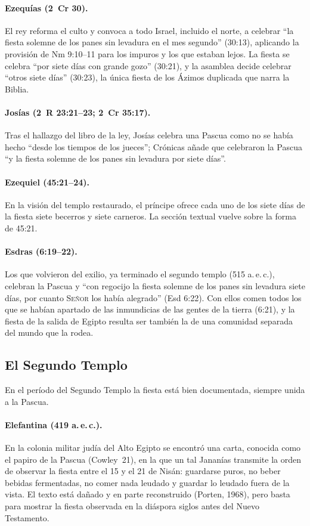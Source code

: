 \documentclass[11pt,letterpaper]{article}
\newcommand{\SENOR}{\textsc{Señor}}
\begin{document}
\paragraph{Ezequías (2~Cr 30).} El rey reforma el culto y convoca a todo Israel, incluido el norte, a celebrar ``la fiesta solemne de los panes sin levadura en el mes segundo'' (30:13), aplicando la provisión de Nm 9:10--11 para los impuros y los que estaban lejos. La fiesta se celebra ``por siete días con grande gozo'' (30:21), y la asamblea decide celebrar ``otros siete días'' (30:23), la única fiesta de los Ázimos duplicada que narra la Biblia.

\paragraph{Josías (2~R 23:21--23; 2~Cr 35:17).} Tras el hallazgo del libro de la ley, Josías celebra una Pascua como no se había hecho ``desde los tiempos de los jueces''; Crónicas añade que celebraron la Pascua ``y la fiesta solemne de los panes sin levadura por siete días''.

\paragraph{Ezequiel (45:21--24).} En la visión del templo restaurado, el príncipe ofrece cada uno de los siete días de la fiesta siete becerros y siete carneros. La sección textual vuelve sobre la forma de 45:21.

\paragraph{Esdras (6:19--22).} Los que volvieron del exilio, ya terminado el segundo templo (515 a.\,e.\,c.), celebran la Pascua y ``con regocijo la fiesta solemne de los panes sin levadura siete días, por cuanto \SENOR{} los había alegrado'' (Esd 6:22). Con ellos comen todos los que se habían apartado de las inmundicias de las gentes de la tierra (6:21), y la fiesta de la salida de Egipto resulta ser también la de una comunidad separada del mundo que la rodea.

\subsection{El Segundo Templo}
En el período del Segundo Templo la fiesta está bien documentada, siempre unida a la Pascua.

\paragraph{Elefantina (419 a.\,e.\,c.).} En la colonia militar judía del Alto Egipto se encontró una carta, conocida como el papiro de la Pascua (Cowley~21), en la que un tal Jananías transmite la orden de observar la fiesta entre el 15 y el 21 de Nisán: guardarse puros, no beber bebidas fermentadas, no comer nada leudado y guardar lo leudado fuera de la vista. El texto está dañado y en parte reconstruido (Porten, 1968), pero basta para mostrar la fiesta observada en la diáspora siglos antes del Nuevo Testamento.
\end{document}
